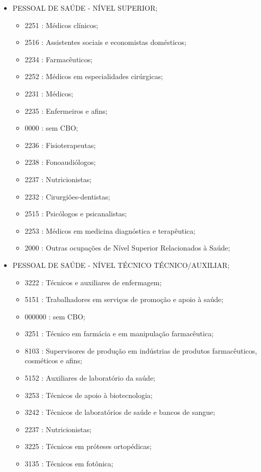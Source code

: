 
\begin{itemize}
  \item PESSOAL DE SAÚDE - NÍVEL SUPERIOR;
  \begin{itemize}
    \item 2251 : Médicos clínicos;
    \item 2516 : Assistentes sociais e economistas domésticos;
    \item 2234 : Farmacêuticos;
    \item 2252 : Médicos em especialidades cirúrgicas;
    \item 2231 : Médicos;
    \item 2235 : Enfermeiros e afins;
    \item 0000 : sem CBO;
    \item 2236 : Fisioterapeutas;
    \item 2238 : Fonoaudiólogos;
    \item 2237 : Nutricionistas;
    \item 2232 : Cirurgiões-dentistas;
    \item 2515 : Psicólogos e psicanalistas;
    \item 2253 : Médicos em medicina diagnóstica e terapêutica;
    \item 2000 : Outras ocupações de Nível Superior Relacionados à Saúde;
  \end{itemize}
  \item PESSOAL DE SAÚDE - NÍVEL TÉCNICO TÉCNICO/AUXILIAR;
  \begin{itemize}
    \item 3222 : Técnicos e auxiliares de enfermagem;
    \item 5151 : Trabalhadores em serviços de promoção e apoio à saúde;
    \item 000000 : sem CBO;
    \item 3251 : Técnico em farmácia e em manipulação farmacêutica;
    \item 8103 : Supervisores de produção em indústrias de produtos farmacêuticos, cosméticos e afins;
    \item 5152 : Auxiliares de laboratório da saúde;
    \item 3253 : Técnicos de apoio à biotecnologia;
    \item 3242 : Técnicos de laboratórios de saúde e bancos de sangue;
    \item 2237 : Nutricionistas;
    \item 3225 : Técnicos em próteses ortopédicas;
    \item 3135 : Técnicos em fotônica;

\end{itemize}
\end{itemize}
